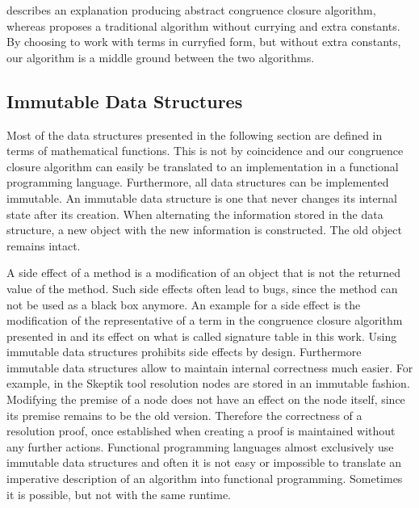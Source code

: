 \cite{Nieuwenhuis2005,Nieuwenhuis2007} describes an explanation producing abstract congruence closure algorithm, 
whereas \cite{Fontaine2004} proposes a traditional algorithm without currying and extra constants.
By choosing to work with terms in curryfied form, but without extra constants, our algorithm is a middle ground between the two algorithms.

\subsection*{Immutable Data Structures}

Most of the data structures presented in the following section are defined in terms of mathematical functions.
This is not by coincidence and our congruence closure algorithm can easily be translated to an implementation in a functional programming language.
Furthermore, all data structures can be implemented immutable.
An immutable data structure is one that never changes its internal state after its creation.
When alternating the information stored in the data structure, a new object with the new information is constructed.
The old object remains intact.

A side effect of a method is a modification of an object that is not the returned value of the method.
Such side effects often lead to bugs, since the method can not be used as a black box anymore.
An example for a side effect is the modification of the representative of a term in the congruence closure algorithm presented in \cite{Fontaine2004} and its effect on what is called signature table in this work.
Using immutable data structures prohibits side effects by design.
Furthermore immutable data structures allow to maintain internal correctness much easier.
For example, in the Skeptik tool resolution nodes are stored in an immutable fashion.
Modifying the premise of a node does not have an effect on the node itself, since its premise remains to be the old version.
Therefore the correctness of a resolution proof, once established when creating a proof is maintained without any further actions.
Functional programming languages almost exclusively use immutable data structures and often it is not easy or impossible to translate an imperative description of an algorithm into functional programming.
Sometimes it is possible, but not with the same runtime.

